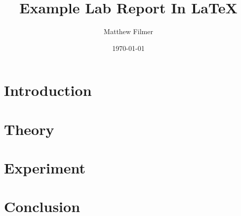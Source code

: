 \documentclass{microereport}
\author{Matthew Filmer}
\date{\today}
\title{Example Lab Report In \LaTeX{}}
\begin{document}
\maketitle
\begin{abstract}
	\lipsum[1]
\end{abstract}

\section{Introduction}
\lipsum[2-4]

\section{Theory}
\lipsum[5-7]

\section{Experiment}
\lipsum[8-12]

\section{Conclusion}
\lipsum[13-14]
\end{document}
